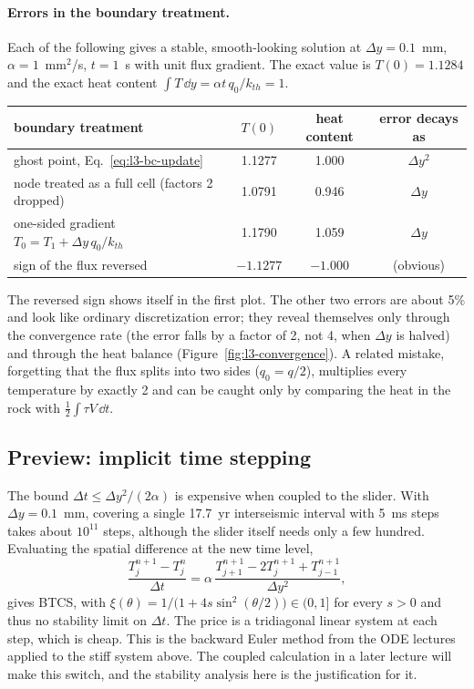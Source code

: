 \paragraph{Errors in the boundary treatment.} Each of the following gives a stable, smooth-looking solution at $\Delta y=0.1$~mm, $\alpha=1$~mm$^2$/s, $t=1$~s with unit flux gradient. The exact value is $T(0)=1.1284$ and the exact heat content $\int T\,\dd y=\alpha t\,q_0/k_{th}=1$.

\begin{center}
\small
\begin{tabular}{lccc}
\toprule
boundary treatment & $T(0)$ & heat content & error decays as \\
\midrule
ghost point, Eq.~\eqref{eq:l3-bc-update} & 1.1277 & 1.000 & $\Delta y^2$ \\
node treated as a full cell (factors 2 dropped) & 1.0791 & 0.946 & $\Delta y$ \\
one-sided gradient $T_0=T_1+\Delta y\,q_0/k_{th}$ & 1.1790 & 1.059 & $\Delta y$ \\
sign of the flux reversed & $-1.1277$ & $-1.000$ & (obvious) \\
\bottomrule
\end{tabular}
\end{center}
The reversed sign shows itself in the first plot. The other two errors are about 5\% and look like ordinary discretization error; they reveal themselves only through the convergence rate (the error falls by a factor of 2, not 4, when $\Delta y$ is halved) and through the heat balance (Figure~\ref{fig:l3-convergence}). A related mistake, forgetting that the flux splits into two sides ($q_0=q/2$), multiplies every temperature by exactly 2 and can be caught only by comparing the heat in the rock with $\tfrac12\int\tau V\,\dd t$.

\subsection{Preview: implicit time stepping}

The bound $\Delta t\le\Delta y^2/(2\alpha)$ is expensive when coupled to the slider. With $\Delta y=0.1$~mm, covering a single 17.7~yr interseismic interval with 5~ms steps takes about $10^{11}$ steps, although the slider itself needs only a few hundred. Evaluating the spatial difference at the new time level,
\begin{equation}
\frac{T_j^{n+1}-T_j^n}{\Delta t}=\alpha\,\frac{T_{j+1}^{n+1}-2T_j^{n+1}+T_{j-1}^{n+1}}{\Delta y^2},
\end{equation}
gives BTCS, with $\xi(\theta)=1/\big(1+4s\sin^2(\theta/2)\big)\in(0,1]$ for every $s>0$ and thus no stability limit on $\Delta t$. The price is a tridiagonal linear system at each step, which is cheap. This is the backward Euler method from the ODE lectures applied to the stiff system above. The coupled calculation in a later lecture will make this switch, and the stability analysis here is the justification for it.

